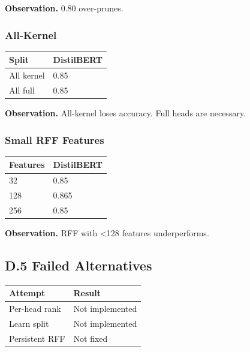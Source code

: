 \textbf{Observation.} 0.80 over-prunes.

\subsubsection{All-Kernel}

\begin{table}[H]
\centering
\small
\begin{tabular}{ll}
\toprule
\textbf{Split} & \textbf{DistilBERT} \\
\midrule
All kernel & 0.85 \\
All full & 0.85 \\
\bottomrule
\end{tabular}
\end{table}

\textbf{Observation.} All-kernel loses accuracy. Full heads are necessary.

\subsubsection{Small RFF Features}

\begin{table}[H]
\centering
\small
\begin{tabular}{ll}
\toprule
\textbf{Features} & \textbf{DistilBERT} \\
\midrule
32 & 0.85 \\
128 & 0.865 \\
256 & 0.85 \\
\bottomrule
\end{tabular}
\end{table}

\textbf{Observation.} RFF with <128 features underperforms.

\subsection{D.5 Failed Alternatives}

\begin{table}[H]
\centering
\small
\begin{tabular}{ll}
\toprule
\textbf{Attempt} & \textbf{Result} \\
\midrule
Per-head rank & Not implemented \\
Learn split & Not implemented \\
Persistent RFF & Not fixed \\
\bottomrule
\end{tabular}
\end{table}

